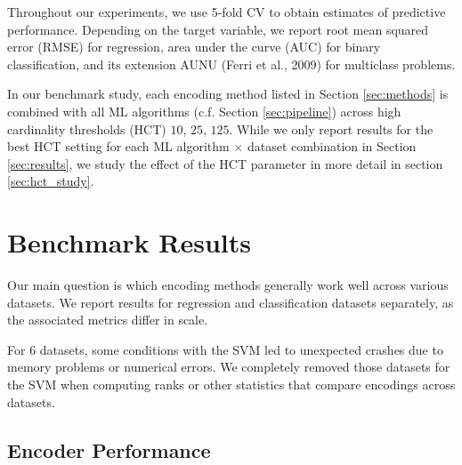 \documentclass[smallextended]{svjour3}       %
\begin{document}
Throughout our experiments, we use 5-fold CV to obtain estimates of predictive performance.
Depending on the target variable, we report root mean squared error (RMSE) for regression, area under the curve (AUC) for binary classification, and its extension AUNU (Ferri et al., 2009) for multiclass problems.

In our benchmark study, each encoding method listed in Section \ref{sec:methods} is combined with all ML algorithms (c.f. Section \ref{sec:pipeline}) across
high cardinality thresholds (HCT) \(10\), \(25\), \(125\).
While we only report results for the best HCT setting for each ML algorithm \(\times\) dataset combination in Section \ref{sec:results}, we study the effect of the HCT parameter in more detail in section \ref{sec:hct_study}.

\hypertarget{benchmark-results}{%
\section{Benchmark Results}\label{benchmark-results}}

\label{sec:results}

Our main question is which encoding methods generally work well across various datasets.
We report results for regression and classification datasets separately, as the associated metrics differ in scale.

For 6 datasets, some conditions with the SVM led to unexpected crashes due to memory problems or numerical errors.
We completely removed those datasets for the SVM when computing ranks or other statistics that compare encodings across datasets.

\hypertarget{encoder-performance}{%
\subsection{Encoder Performance}\label{encoder-performance}}
\end{document}
